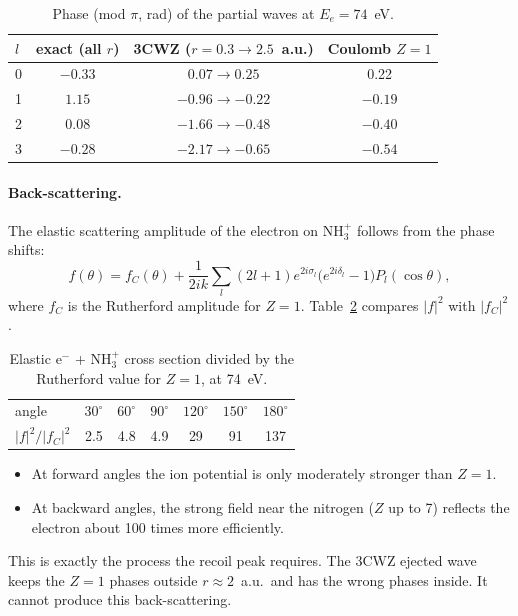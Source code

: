 \documentclass[11pt,a4paper]{article}
\begin{document}
\begin{table}[H]\centering\small
\caption{Phase (mod $\pi$, rad) of the partial waves at $E_e=74$~eV.}\label{tab:pw}
\begin{tabular}{lccc}\toprule
$l$ & exact (all $r$) & 3CWZ ($r=0.3\to2.5$~a.u.) & Coulomb $Z=1$\\\midrule
0 & $-0.33$ & $0.07\to0.25$ & 0.22\\
1 & $1.15$ & $-0.96\to-0.22$ & $-0.19$\\
2 & $0.08$ & $-1.66\to-0.48$ & $-0.40$\\
3 & $-0.28$ & $-2.17\to-0.65$ & $-0.54$\\\bottomrule
\end{tabular}
\end{table}

\paragraph{Back-scattering.} The elastic scattering amplitude of the electron on NH$_3^+$ follows
from the phase shifts:
\begin{equation}
f(\theta)=f_C(\theta)+\frac1{2ik}\sum_l(2l+1)e^{2i\sigma_l}\big(e^{2i\delta_l}-1\big)P_l(\cos\theta),
\end{equation}
where $f_C$ is the Rutherford amplitude for $Z=1$. Table~\ref{tab:back} compares $|f|^2$ with
$|f_C|^2$.

\begin{table}[H]\centering\small
\caption{Elastic e$^-$ + NH$_3^+$ cross section divided by the Rutherford value for $Z=1$, at 74~eV.}\label{tab:back}
\begin{tabular}{lcccccc}\toprule
angle & $30^\circ$ & $60^\circ$ & $90^\circ$ & $120^\circ$ & $150^\circ$ & $180^\circ$\\
$|f|^2/|f_C|^2$ & 2.5 & 4.8 & 4.9 & 29 & 91 & 137\\\bottomrule
\end{tabular}
\end{table}

\begin{itemize}
\item At forward angles the ion potential is only moderately stronger than $Z=1$.
\item At backward angles, the strong field near the nitrogen ($Z$ up to 7) reflects the electron
  about 100 times more efficiently.
\end{itemize}
This is exactly the process the recoil peak requires. The 3CWZ ejected wave keeps the $Z=1$ phases
outside $r\approx2$~a.u.\ and has the wrong phases inside. It cannot produce this back-scattering.
\end{document}
